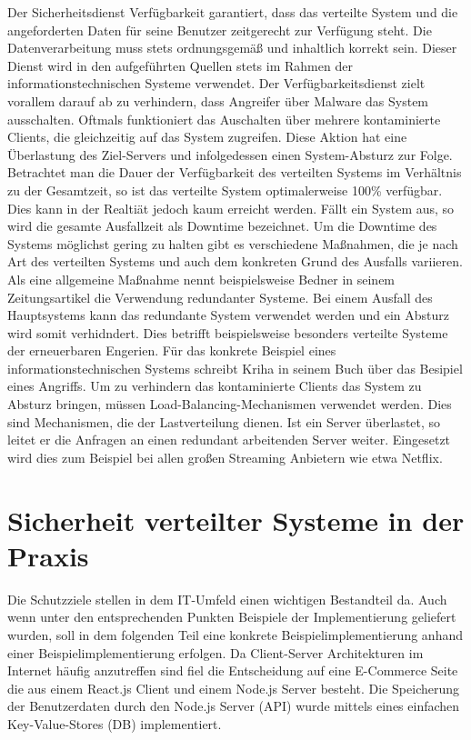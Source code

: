\documentclass[utf8,biblatex]{lni}
\begin{document}
Der Sicherheitsdienst Verfügbarkeit garantiert, dass das verteilte System und die angeforderten Daten für seine Benutzer zeitgerecht zur Verfügung steht. Die Datenverarbeitung muss stets ordnungsgemäß
und inhaltlich korrekt sein. \citet{Bedner.2010}
Dieser Dienst wird in den aufgeführten Quellen stets im Rahmen der informationstechnischen Systeme verwendet. Der Verfügbarkeitsdienst
  zielt vorallem darauf ab zu verhindern, 
dass Angreifer über Malware das System ausschalten. Oftmals funktioniert das Auschalten über mehrere kontaminierte Clients, die gleichzeitig auf das System zugreifen. 
Diese Aktion hat eine Überlastung des Ziel-Servers und infolgedessen einen System-Absturz zur Folge. \citet{Kriha.2008}
\newline
Betrachtet man die Dauer der Verfügbarkeit des verteilten Systems im Verhältnis zu der Gesamtzeit, so ist das verteilte System optimalerweise 100\% verfügbar. Dies kann in der Realtiät jedoch kaum erreicht werden.
Fällt ein System aus, so wird die gesamte Ausfallzeit als Downtime bezeichnet. \citet{Bedner.2010}
\newline
 Um die Downtime des Systems möglichst gering zu halten gibt es verschiedene Maßnahmen, die je nach Art des verteilten Systems und auch
dem konkreten Grund des Ausfalls variieren. Als eine allgemeine Maßnahme nennt beispielsweise Bedner in seinem Zeitungsartikel \citet{Bedner.2010} die Verwendung redundanter Systeme. Bei einem Ausfall
des Hauptsystems kann das redundante System verwendet werden und ein Absturz wird somit verhidndert. Dies betrifft beispielsweise besonders verteilte Systeme der erneuerbaren Engerien.
Für das konkrete Beispiel eines informationstechnischen Systems schreibt Kriha in seinem Buch \citet{Kriha.2008} über das Besipiel eines Angriffs. Um zu verhindern das kontaminierte Clients das System zu Absturz
bringen, müssen Load-Balancing-Mechanismen verwendet werden. Dies sind Mechanismen, die der Lastverteilung dienen. Ist ein Server überlastet, so leitet er die Anfragen an einen redundant arbeitenden Server weiter.
Eingesetzt wird dies zum Beispiel bei allen großen Streaming Anbietern wie etwa Netflix.

\section{Sicherheit verteilter Systeme in der Praxis}

Die Schutzziele stellen in dem IT-Umfeld einen wichtigen Bestandteil da. Auch wenn unter den entsprechenden Punkten Beispiele der Implementierung geliefert wurden, 
soll in dem folgenden Teil eine konkrete Beispielimplementierung anhand einer Beispielimplementierung erfolgen. 
Da Client-Server Architekturen im Internet häufig anzutreffen sind fiel die Entscheidung auf eine E-Commerce Seite die aus einem React.js Client und 
einem Node.js Server besteht. 
Die Speicherung der Benutzerdaten durch den Node.js Server (API) wurde mittels eines einfachen Key-Value-Stores (DB) implementiert. 
\end{document}

